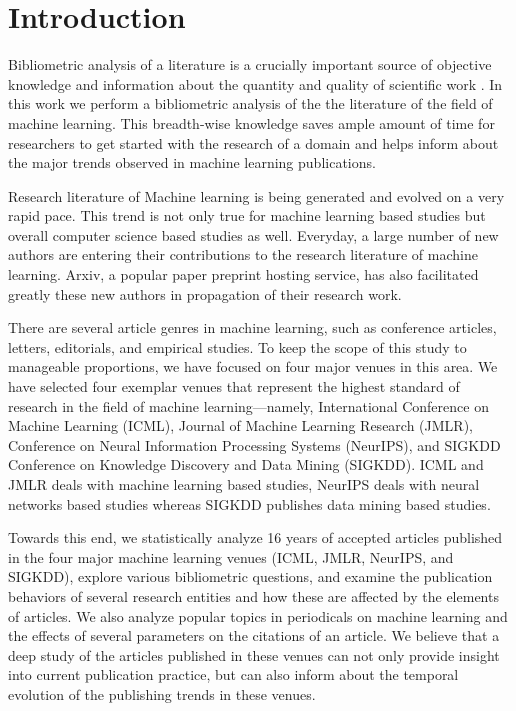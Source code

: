 \section{Introduction}

Bibliometric analysis of a literature is a crucially important source of objective knowledge and information about the quantity and quality of scientific work \citep{narin1994bibliometrics}. In this work we perform a bibliometric analysis of the the literature of the field of machine learning. This breadth-wise knowledge saves ample amount of time for researchers to get started with the research of a domain and helps inform about the major trends observed in machine learning publications.

Research literature of Machine learning is being generated and evolved on a very rapid pace. This trend is not only true for machine learning based studies but overall computer science based studies as well. Everyday, a large number of new authors are entering their contributions to the research literature of machine learning. Arxiv, a popular paper preprint hosting service, has also facilitated greatly these new authors in propagation of their research work.

There are several article genres in machine learning, such as conference articles, letters, editorials, and empirical studies. To keep the scope of this study to manageable proportions, we have focused on four major venues in this area. We have selected four exemplar venues that represent the highest standard of research in the field of machine learning---namely, International Conference on Machine Learning (ICML), Journal of Machine Learning Research (JMLR), Conference on Neural Information Processing Systems (NeurIPS), and SIGKDD Conference on Knowledge Discovery and Data Mining (SIGKDD). ICML and JMLR deals with machine learning based studies, NeurIPS deals with neural networks based studies whereas SIGKDD publishes data mining based studies. 

Towards this end, we statistically analyze 16 years of accepted articles published in the four major machine learning venues (ICML, JMLR, NeurIPS, and SIGKDD), explore various bibliometric questions, and examine the publication behaviors of several research entities and how these are affected by the elements of articles. We also analyze popular topics in periodicals on machine learning and the effects of several parameters on the citations of an article. We believe that a deep study of the articles published in these venues can not only provide insight into current publication practice, but can also inform about the temporal evolution of the publishing trends in these venues. 

